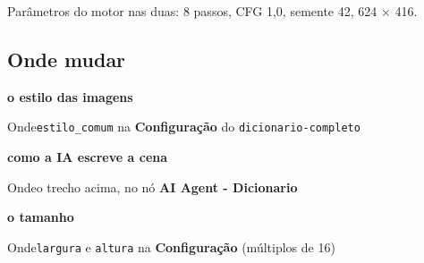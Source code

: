 Parâmetros do motor nas duas: 8 passos, CFG 1,0, semente 42, 624 × 416.

\subsection*{Onde mudar}

\begin{recordbox}
{\bfseries\color{accent} o estilo das imagens}\par
{\small\color{muted} Onde}\quad \nolinkurl{estilo_comum} na \textbf{Configuração} do \nolinkurl{dicionario-completo}\par
\end{recordbox}
\begin{recordbox}
{\bfseries\color{accent} como a IA escreve a cena}\par
{\small\color{muted} Onde}\quad o trecho acima, no nó \textbf{AI Agent - Dicionario}\par
\end{recordbox}
\begin{recordbox}
{\bfseries\color{accent} o tamanho}\par
{\small\color{muted} Onde}\quad \texttt{largura} e \texttt{altura} na \textbf{Configuração} (múltiplos de 16)\par
\end{recordbox}
